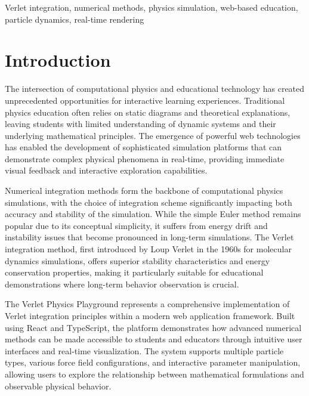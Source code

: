 \documentclass[12pt,journal,onecolumn]{IEEEtran}
\begin{document}
\begin{IEEEkeywords}
Verlet integration, numerical methods, physics simulation, web-based education, particle dynamics, real-time rendering
\end{IEEEkeywords}

\clearpage
\tableofcontents
\clearpage


\section{Introduction}
The intersection of computational physics and educational technology has created unprecedented opportunities for interactive learning experiences. Traditional physics education often relies on static diagrams and theoretical explanations, leaving students with limited understanding of dynamic systems and their underlying mathematical principles. The emergence of powerful web technologies has enabled the development of sophisticated simulation platforms that can demonstrate complex physical phenomena in real-time, providing immediate visual feedback and interactive exploration capabilities.

Numerical integration methods form the backbone of computational physics simulations, with the choice of integration scheme significantly impacting both accuracy and stability of the simulation. While the simple Euler method remains popular due to its conceptual simplicity, it suffers from energy drift and instability issues that become pronounced in long-term simulations. The Verlet integration method, first introduced by Loup Verlet in the 1960s for molecular dynamics simulations, offers superior stability characteristics and energy conservation properties, making it particularly suitable for educational demonstrations where long-term behavior observation is crucial.

The Verlet Physics Playground represents a comprehensive implementation of Verlet integration principles within a modern web application framework. Built using React and TypeScript, the platform demonstrates how advanced numerical methods can be made accessible to students and educators through intuitive user interfaces and real-time visualization. The system supports multiple particle types, various force field configurations, and interactive parameter manipulation, allowing users to explore the relationship between mathematical formulations and observable physical behavior.
\end{document}
